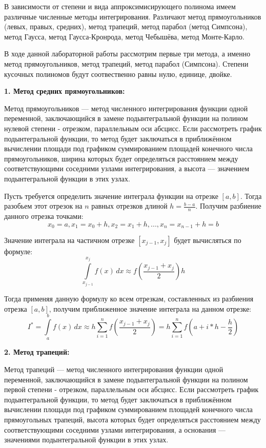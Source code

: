 \documentclass [12pt]{article}
\begin{document}
В зависимости от степени и вида аппроксимисирующего полинома имеем различные численные методы интегрирования. Различают метод прямоугольников (левых, правых, средних), метод трапеций, метод парабол (метод Симпсона), метод Гаусса, метод Гаусса-Кронрода, метод Чебышёва, метод Монте-Карло. 

В ходе данной лабораторной работы рассмотрим первые три метода, а именно метод прямоугольников, метод трапеций, метод парабол (Симпсона). Степени кусочных полиномов будут соотвественно равны нулю, единице, двойке.

\textbf{1. Метод средних прямоугольников:}

Метод прямоугольников — метод численного интегрирования функции одной переменной, заключающийся в замене подынтегральной функции на полином нулевой степени - отрезком, параллельным оси абсцисс. Если рассмотреть график подынтегральной функции, то метод будет заключаться в приближённом вычислении площади под графиком суммированием площадей конечного числа прямоугольников, ширина которых будет определяться расстоянием между соответствующими соседними узлами интегрирования, а высота — значением подынтегральной функции в этих узлах.

Пусть требуется определить значение интеграла функции на отрезке $[a,b]$. Тогда разобьем этот отрезок на $n$ равных отрезков длиной $h=\frac{b-a}{n}$. Получим разбиение данного отрезка точками: $$x_{0} = a, x_{1} = x_{0} + h, x_{2} = x_{1} + h, ... , x_{n} = x_{n-1} + h = b $$

Значение интеграла на частичном отрезке $[x_{j-1},x_{j}]$ будет вычисляться по формуле: $$\int\limits_{x_{j-1}}^{x_{j}} f(x)\,dx \approx f(\frac{x_{j-1}+x_{j}}{2})h$$

Тогда применяя данную формулу ко всем отрезкам, составленных из разбиения отрезка $[a,b]$, получим приближенное значение интеграла на данном отрезке: $$I^{*} = \int\limits_{a}^{b} f(x)\,dx \approx h\sum\limits_{i=1}^n f(\frac{x_{j-1}+x_{j}}{2}) = h\sum\limits_{i=1}^n f(a+i*h-\frac{h}{2})$$

\textbf{2. Метод трапеций:}

Метод трапеций — метод численного интегрирования функции одной переменной, заключающийся в замене подынтегральной функции на полином первой степени - отрезком, параллельным оси абсцисс. Если рассмотреть график подынтегральной функции, то метод будет заключаться в приближённом вычислении площади под графиком суммированием площадей конечного числа прямоугольных трапеций, высота которых будет определяться расстоянием между соответствующими соседними узлами интегрирования, а основания — значениями подынтегральной функции в этих узлах.
\end{document}
